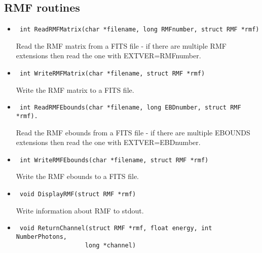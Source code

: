 \documentclass[11pt]{book}
\begin{document}
\subsection{RMF routines}

\begin{itemize}

\item      \begin{verbatim} int ReadRMFMatrix(char *filename, long RMFnumber, struct RMF *rmf)\end{verbatim}

               Read the RMF matrix from a FITS file - if there are 
               multiple RMF extensions then read the one with EXTVER=RMFnumber.

\item      \begin{verbatim} int WriteRMFMatrix(char *filename, struct RMF *rmf)\end{verbatim}

               Write the RMF matrix to a FITS file.

\item      \begin{verbatim} int ReadRMFEbounds(char *filename, long EBDnumber, struct RMF *rmf).\end{verbatim}

               Read the RMF ebounds from a FITS file - if there
               are multiple EBOUNDS extensions then read the one with 
               EXTVER=EBDnumber.

\item      \begin{verbatim} int WriteRMFEbounds(char *filename, struct RMF *rmf)\end{verbatim}

               Write the RMF ebounds to a FITS file.

\item      \begin{verbatim} void DisplayRMF(struct RMF *rmf)\end{verbatim}

               Write information about RMF to stdout.

\item      \begin{verbatim} void ReturnChannel(struct RMF *rmf, float energy, int NumberPhotons, 
                   long *channel)\end{verbatim}
 

\end{itemize}
\end{document}

